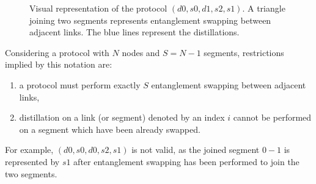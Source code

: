 \documentclass{article}
\begin{document}
\begin{figure}[ht!]
  \centering
  \caption{Visual representation of the protocol $(d0, s0, d1, s2, s1)$. A triangle joining two segments represents entanglement swapping between adjacent links. The blue lines represent the distillations.}
  \label{fig:triangle_notation}
\end{figure}

Considering a protocol with $N$ nodes and $S=N-1$ segments, restrictions implied by this notation are:
\begin{enumerate}
  \item a protocol must perform exactly $S$ entanglement swapping between adjacent links,
  \item distillation on a link (or segment) denoted by an index $i$ cannot be performed on a segment which have been already swapped.
\end{enumerate}

For example, $(d0, s0, d0, s2, s1)$ is not valid, as the joined segment $0-1$ is represented by $s1$ after entanglement swapping has been performed to join the two segments.
\end{document}
